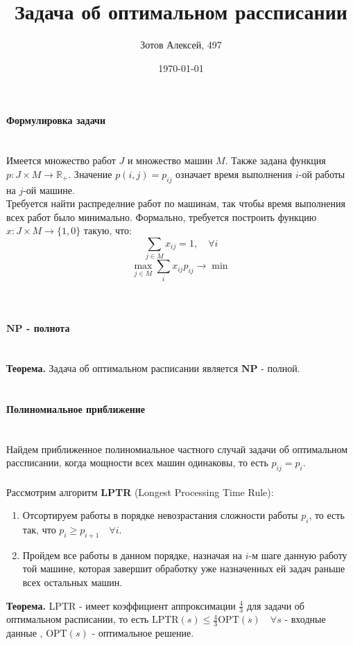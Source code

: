 \documentclass[10pt]{article}
\title{Задача об оптимальном рассписании}
\author{Зотов Алексей, 497}
\date{\today}
\begin{document}
\maketitle
\paragraph{\Large {Формулировка задачи\\\\}} 

\indent Имеется множество работ $J$ и множество машин $M$. Также задана функция $p: J \times M \to \mathbb{R}_+$. Значение $p(i,j) = p_{ij}$ означает время выполнения $i$-ой работы на $j$-ой машине. \\
Требуется найти распределние работ по машинам, так чтобы время выполнения всех работ было минимально. Формально, требуется построить функцию $x : J \times M \to \{1,0\}$ такую, что: 
\begin{equation}
    \sum_{j \in M} x_{ij} = 1 , \quad \forall i
\end{equation}
\begin{equation}
    \max_{j \in M} \sum_{i} x_{ij} p_{ij} \to \min 
\end{equation}
\\
\\
\paragraph{\Large{$\mathbf{NP}$ - полнота\\\\}}
\indent \textbf{Теорема.} Задача об оптимальном расписании является $\mathbf{NP}$ - полной.
\\
\\
\paragraph{\Large{Полиномиальное приближение\\\\}}
\indent Найдем приближенное полиномиальное частного случай задачи об оптимальном рассписании, когда мощности всех машин одинаковы, то есть $p_{ij} = p_i$. \\ \\ 
Рассмотрим алгоритм \textbf{LPTR} (Longest Processing Time Rule): \\
\begin{enumerate}
    \item Отсортируем работы в порядке невозрастания сложности работы $p_i$, то есть так, что $p_i \geq p_{i+1} \quad \forall i$. 
    \item Пройдем все работы в данном порядке, назначая на $i$-м шаге данную работу той машине, которая завершит обработку уже назначенных ей задач раньше всех остальных машин.
\end{enumerate}

\indent \textbf{Теорема.} LPTR - имеет коэффициент аппроксимации $\frac{4}{3}$ для задачи об оптимальном расписании, 
то есть $ \text{LPTR} (s) \leq \frac{4}{3} \text{OPT} (s) \quad \forall s$ - входные данные , $\text{OPT} (s)$ - оптимальное решение. 
\end{document}
